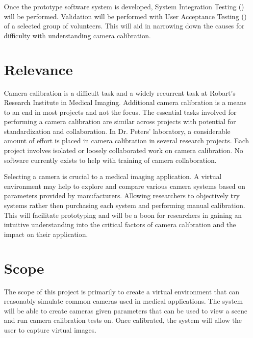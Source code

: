 \documentclass[11pt]{report}
\begin{document}


Once the prototype software system is developed, System Integration Testing () will be performed. Validation will be performed with User Acceptance Testing () of a selected group of volunteers. This will aid in narrowing down the causes for difficulty with understanding camera calibration. 

\section{Relevance}

Camera calibration is a difficult task and a widely recurrent task at Robart's Research Institute in Medical Imaging. Additional camera calibration is a means to an end in most projects and not the focus. The essential tasks involved for performing a camera calibration are similar across projects with potential for standardization and collaboration. In Dr. Peters' laboratory, a considerable amount of effort is placed in camera calibration in several research projects. Each project involves isolated or loosely collaborated work on camera calibration. No software currently exists to help with training of camera collaboration. 

Selecting a camera is crucial to a medical imaging application. A virtual environment may help to explore and compare various camera systems based on parameters provided by manufacturers. Allowing researchers to objectively try systems rather then purchasing each system and performing manual calibration. This will facilitate prototyping and will be a boon for researchers in  gaining an intuitive understanding into the critical factors of camera calibration and the impact on their application. 

\section{Scope}
The scope of this project is primarily to create a virtual environment that can reasonably simulate common cameras used in medical applications. The system will be able to create cameras given parameters that can be used to view a scene and run camera calibration tests on. Once calibrated, the system will allow the user to capture virtual images. 
 
\end{document}
